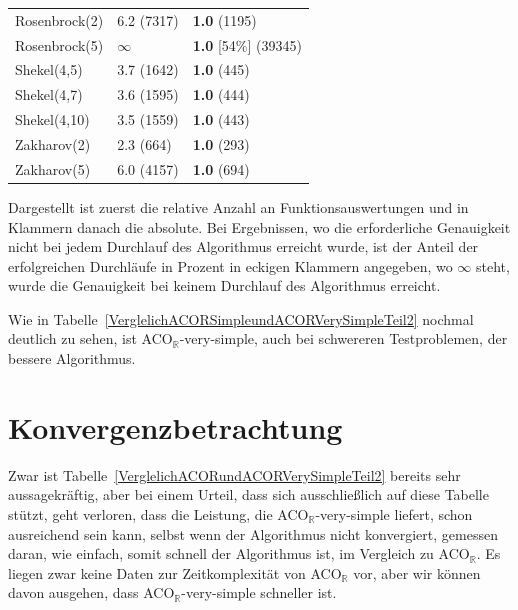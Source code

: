 \documentclass[fontsize=12, a4aper]{scrartcl}
\begin{document}
\begin{table}[H]
\begin{tabularx}{\textwidth}{l|l|l}
			Rosenbrock(2) & 6.2 (7317) & \textbf{1.0} (1195)\\
			
			Rosenbrock(5) & \(\infty\) & \textbf{1.0} [54\%] (39345)\\
			
			Shekel(4,5) & 3.7 (1642) & \textbf{1.0} (445)\\
			
			Shekel(4,7) & 3.6 (1595) & \textbf{1.0} (444)\\
			
			Shekel(4,10) & 3.5 (1559) & \textbf{1.0} (443)\\
			
			Zakharov(2) & 2.3 (664) & \textbf{1.0} (293)\\
			
			Zakharov(5) & 6.0 (4157) & \textbf{1.0} (694)\\
			
		\end{tabularx}
		
		\smallskip
		
		Dargestellt ist zuerst die relative Anzahl an Funktionsauswertungen und in Klammern danach die absolute. Bei Ergebnissen, wo die erforderliche Genauigkeit nicht bei jedem Durchlauf des Algorithmus erreicht wurde, ist der Anteil der erfolgreichen Durchläufe in Prozent in eckigen Klammern angegeben, wo \(\infty\) steht, wurde die Genauigkeit bei keinem Durchlauf des Algorithmus erreicht.\hfill\newline
		
	\end{table}

	Wie in Tabelle~\ref{VerglelichACORSimpleundACORVerySimpleTeil2} nochmal deutlich zu sehen, ist ACO\(_{\mathbb{R}}\)-very-simple, auch bei schwereren Testproblemen, der bessere Algorithmus.\hfill\newline

	\section{Konvergenzbetrachtung} \label{Konvergenzbetrachtung}
	
	Zwar ist Tabelle~\ref{VerglelichACORundACORVerySimpleTeil2} bereits sehr aussagekräftig, aber bei einem Urteil, dass sich ausschließlich auf diese Tabelle stützt, geht verloren, dass die Leistung, die ACO\(_{\mathbb{R}}\)-very-simple liefert, schon ausreichend sein kann, selbst wenn der Algorithmus nicht konvergiert, gemessen daran, wie einfach, somit schnell der Algorithmus ist, im Vergleich zu ACO\(_{\mathbb{R}}\). Es liegen zwar keine Daten zur Zeitkomplexität von ACO\(_{\mathbb{R}}\) vor, aber wir können davon ausgehen, dass ACO\(_{\mathbb{R}}\)-very-simple schneller ist.\hfill\newline
	
\end{document}
